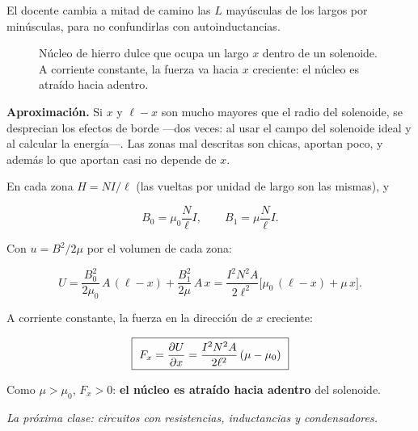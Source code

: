 \documentclass[12pt,a4paper]{article}
\begin{document}
\begin{notebox}
El docente cambia a mitad de camino las $L$ mayúsculas de los largos por
minúsculas, para no confundirlas con autoinductancias.
\end{notebox}

\begin{figure}[H]
  \centering
  
  \caption{Núcleo de hierro dulce que ocupa un largo $x$ dentro de un solenoide. A corriente constante, la fuerza va hacia $x$ creciente: el núcleo es atraído hacia adentro.}
\end{figure}

\textbf{Aproximación.} Si $x$ y $\ell - x$ son mucho mayores que el radio del
solenoide, se desprecian los efectos de borde ---dos veces: al usar el campo del
solenoide ideal y al calcular la energía---. Las zonas mal descritas son chicas,
aportan poco, y además lo que aportan casi no depende de $x$.

En cada zona $H = N I/\ell$ (las vueltas por unidad de largo son las mismas), y

\[
B_0 = \mu_0\frac{N}{\ell}I,\qquad B_1 = \mu\frac{N}{\ell}I .
\]

Con $u = B^2/2\mu$ por el volumen de cada zona:

\[
U = \frac{B_0^2}{2\mu_0}\,A\,(\ell-x) + \frac{B_1^2}{2\mu}\,A\,x
= \frac{I^2 N^2 A}{2\ell^2}\Big[\mu_0\,(\ell-x) + \mu\,x\Big].
\]

A corriente constante, la fuerza en la dirección de $x$ creciente:

\begin{keybox}
\[
\boxed{\ F_x = \pdv{U}{x} = \frac{I^2 N^2 A}{2\ell^2}\,(\mu-\mu_0)\ }
\]
\end{keybox}

Como $\mu > \mu_0$, $F_x > 0$: \textbf{el núcleo es atraído hacia adentro} del
solenoide.

\noindent\emph{La próxima clase: circuitos con resistencias, inductancias y condensadores.}
\end{document}
